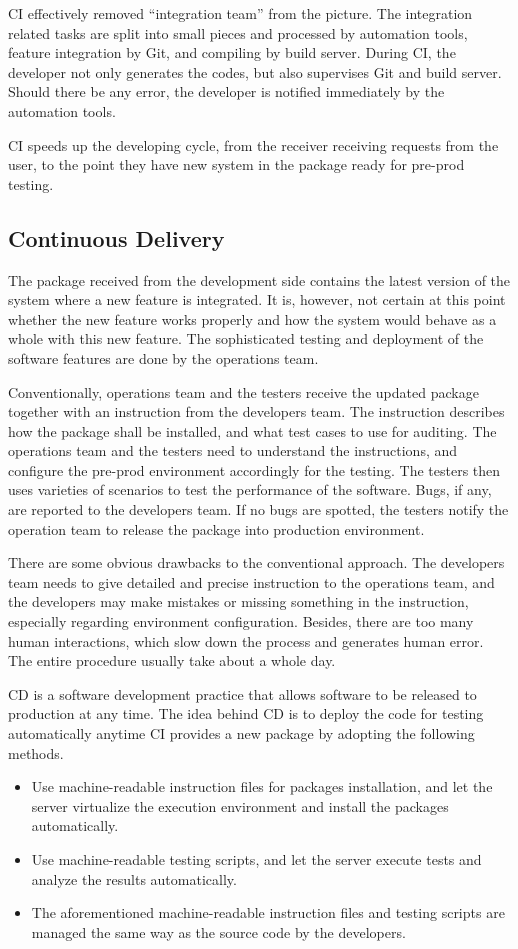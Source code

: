 CI effectively removed ``integration team'' from the picture. The integration related tasks are split into small pieces and processed by automation tools, feature integration by Git, and compiling by build server. During CI, the developer not only generates the codes, but also supervises Git and build server. Should there be any error, the developer is notified immediately by the automation tools.

CI speeds up the developing cycle, from the receiver receiving requests from the user, to the point they have new system in the package ready for pre-prod testing.

\subsection{Continuous Delivery}

The package received from the development side contains the latest version of the system where a new feature is integrated. It is, however, not certain at this point whether the new feature works properly and how the system would behave as a whole with this new feature. The sophisticated testing and deployment of the software features are done by the operations team.

Conventionally, operations team and the testers receive the updated package together with an instruction from the developers team. The instruction describes how the package shall be installed, and what test cases to use for auditing. The operations team and the testers need to understand the instructions, and configure the pre-prod environment accordingly for the testing. The testers then uses varieties of scenarios to test the performance of the software. Bugs, if any, are reported to the developers team. If no bugs are spotted, the testers notify the operation team to release the package into production environment.

There are some obvious drawbacks to the conventional approach. The developers team needs to give detailed and precise instruction to the operations team, and the developers may make mistakes or missing something in the instruction, especially regarding environment configuration. Besides, there are too many human interactions, which slow down the process and generates human error. The entire procedure usually take about a whole day.

CD is a software development practice that allows software to be released to production at any time. The idea behind CD is to deploy the code for testing automatically anytime CI provides a new package by adopting the following methods.
\begin{itemize}
  \item Use machine-readable instruction files for packages installation, and let the server virtualize the execution environment and install the packages automatically.
  \item Use machine-readable testing scripts, and let the server execute tests and analyze the results automatically.
  \item The aforementioned machine-readable instruction files and testing scripts are managed the same way as the source code by the developers.
\end{itemize}

